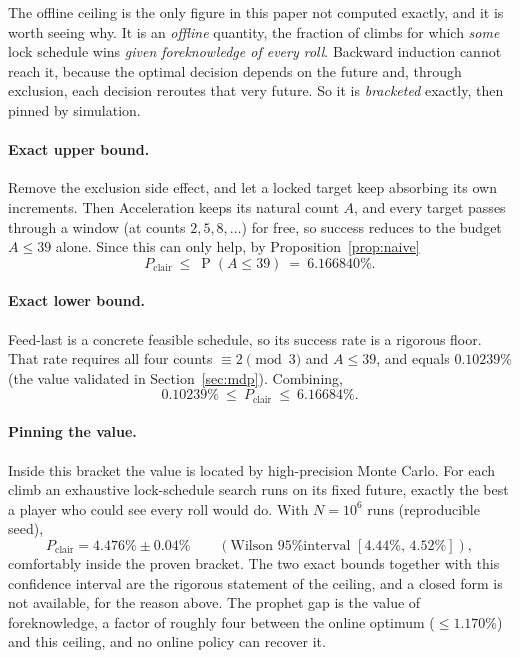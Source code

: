 \documentclass[11pt]{article}
\theoremstyle{remark}
\newcommand{\Prob}{\operatorname{P}}
\begin{document}
The offline ceiling is the only figure in this paper not computed exactly, and it
is worth seeing why. It is an \emph{offline} quantity, the fraction of climbs for which
\emph{some} lock schedule wins \emph{given foreknowledge of every roll}. Backward
induction cannot reach it, because the optimal decision depends on the future and,
through exclusion, each decision reroutes that very future. So it is \emph{bracketed}
exactly, then pinned by simulation.

\paragraph{Exact upper bound.}
Remove the exclusion side effect, and let a locked target keep absorbing its own
increments. Then Acceleration keeps its natural count $A$, and every target passes
through a window (at counts $2,5,8,\dots$) for free, so success reduces to the budget
$A\le 39$ alone. Since this can only help, by Proposition~\ref{prop:naive}
\[
   P_{\text{clair}}\ \le\ \Prob(A\le 39)\ =\ 6.166840\%.
\]

\paragraph{Exact lower bound.}
Feed-last is a concrete feasible schedule, so its success rate is a rigorous floor.
That rate requires all four counts $\equiv 2\pmod 3$ and $A\le 39$, and equals
$0.10239\%$ (the value validated in Section~\ref{sec:mdp}). Combining,
\[
   0.10239\%\ \le\ P_{\text{clair}}\ \le\ 6.16684\%.
\]

\paragraph{Pinning the value.}
Inside this bracket the value is located by high-precision Monte Carlo. For each climb
an exhaustive lock-schedule search runs on its fixed future, exactly the best a
player who could see every roll would do. With $N=10^{6}$ runs (reproducible seed),
\[
   P_{\text{clair}} = 4.476\% \pm 0.04\%\qquad(\text{Wilson 95\% interval }[4.44\%,\,4.52\%]),
\]
comfortably inside the proven bracket. The two exact bounds together with this
confidence interval are the rigorous statement of the ceiling, and a closed form is not
available, for the reason above. The prophet gap is the value of foreknowledge, a
factor of roughly four between the online optimum ($\le 1.170\%$) and this ceiling, and
no online policy can recover it.

\end{document}
